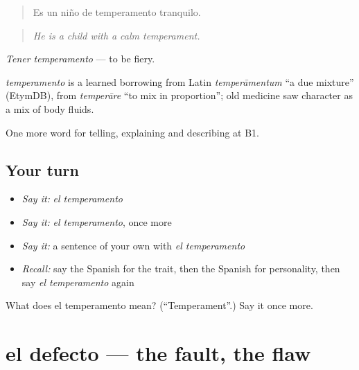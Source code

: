 \begin{quote}
Es un niño de temperamento tranquilo.
\end{quote}

\begin{quote}
\emph{He is a child with a calm temperament.}
\end{quote}

\emph{Tener temperamento} — to be fiery.

\begin{cousinweb}
\emph{temperamento} is a learned borrowing from Latin \emph{temperāmentum} \textquotedblleft{}a due mixture\textquotedblright{} (EtymDB), from \emph{temperāre} \textquotedblleft{}to mix in proportion\textquotedblright{}; old medicine saw character as a mix of body fluids.
\end{cousinweb}

\begin{grammarlens}[title={What you've built}]
One more word for telling, explaining and describing at B1.
\end{grammarlens}

\subsection*{Your turn}
\begin{itemize}
\raggedright
  \item \emph{Say it:} \emph{el temperamento}
  \item \emph{Say it:} \emph{el temperamento}, once more
  \item \emph{Say it:} a sentence of your own with \emph{el temperamento}
  \item \emph{Recall:} say the Spanish for the trait, then the Spanish for personality, then say \emph{el temperamento} again
\end{itemize}

\begin{tcolorbox}[breakable,colback=teal!4,colframe=teal!35!black,title={Before you move on}]
What does el temperamento mean? (\textquotedblleft{}Temperament\textquotedblright{}.) Say it once more.
\end{tcolorbox}
\section[el defecto]{el defecto — the fault, the flaw}

\label{lesson:ES-C721-defecto}



